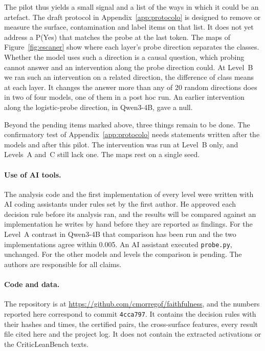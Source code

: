 \documentclass[10pt]{article}
\newcommand{\vr}[1]{\texttt{#1}}
\begin{document}
The pilot thus yields a small signal and a list of the ways in which it could be an artefact. The draft protocol in
Appendix~\ref{app:protocolo} is designed to remove or measure the surface, contamination and label items on that
list. It does not yet address a P(Yes) that matches the probe at the last token. The maps of Figure~\ref{fig:escaner} show where each layer's probe direction separates the classes. Whether the model uses such a direction is a causal question, which
probing cannot answer and an intervention along the probe direction could.
At Level~B we ran such an intervention on a related direction, the difference of class means at each layer. It changes
the answer more than any of 20 random directions does in two of four models, one of them in a post hoc run.
An earlier intervention along the logistic-probe direction, in Qwen3-4B, gave a null.

Beyond the pending items marked above, three things remain to be done. The confirmatory test of Appendix~\ref{app:protocolo} needs statements written after
the models and after this pilot. The intervention was run at Level~B only, and Levels~A and~C still lack one. The maps
rest on a single seed.

\paragraph{Use of AI tools.}
The analysis code and the first implementation of every level were written with AI coding assistants under rules
set by the first author. He approved each decision rule before its analysis ran, and the results will be compared
against an implementation he writes by hand before they are reported as findings. For the Level~A contrast in
Qwen3-4B that comparison has been run and the two implementations agree within 0.005. An AI assistant executed
\vr{probe.py}, unchanged. For the other models and levels the comparison is pending. The
authors are responsible for all claims.

\paragraph{Code and data.}
The repository is at \url{https://github.com/cmorregof/faithfulness}, and the numbers reported here correspond to
commit \vr{4cca797}. It contains the decision rules with their hashes and times, the certified pairs, the
cross-surface features, every result file cited here and the project log. It does not contain the extracted
activations or the CriticLeanBench texts.
\end{document}
